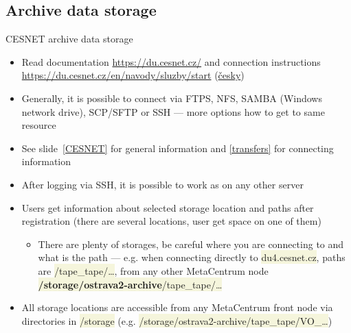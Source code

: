 \documentclass[compress, xelatex, 11pt, xcolor=svgnames, aspectratio=169,
	hyperref={
		bookmarks=true,
		unicode=true,
		colorlinks=true,
		pdftitle={Linux, command line and MetaCentrum},
		plainpages=false,
		pdfauthor={Vojtech Zeisek},
		pdfsubject={Course about use of Linux command line, writing shell scripts and using MetaCentrum of CESNET},
		pdfcreator={XeLaTeX},
		pdfkeywords={Linux, GNU, BASH, shell, command line, MetaCentrum},
		linkcolor=DarkRed, %
		anchorcolor=DarkBlue, %
		citecolor=Indigo, %
		filecolor=NavyBlue, %
		menucolor=DarkMagenta, %
		urlcolor=DarkBlue, %
		},
	url={hyphens, lowtilde} %
	]{beamer}
\renewcommand{\texttt}[1]{\colorbox{Beige}{{\ttfamily #1}}}
\begin{document}
\subsection{Archive data storage}

\begin{frame}{CESNET archive data storage}
	\begin{itemize}
		\item Read documentation \url{https://du.cesnet.cz/} and connection instructions \url{https://du.cesnet.cz/en/navody/sluzby/start} (\href{https://du.cesnet.cz/cs/navody/sluzby/start}{česky})
		\item Generally, it is possible to connect via FTPS, NFS, SAMBA (Windows network drive), SCP/SFTP or SSH --- more options how to get to same resource
		\item See slide~\ref{CESNET} for general information and \ref{transfers} for connecting information
		\item After logging via SSH, it is possible to work as on any other server
		\item Users get information about selected storage location and paths after registration (there are several locations, user get space on one of them)
		\begin{itemize}
			\item There are plenty of storages, be careful where you are connecting to and what is the path --- e.g. when connecting directly to \texttt{du4.cesnet.cz}, paths are \texttt{/tape\_tape/\ldots}, from any other MetaCentrum node \texttt{\textbf{/storage/ostrava2-archive}/tape\_tape/\ldots}
		\end{itemize}
		\item All storage locations are accessible from any MetaCentrum front node via directories in \texttt{/storage} (e.g. \texttt{/storage/ostrava2-archive/tape\_tape/VO\_\ldots})
	\end{itemize}
\end{frame}
\end{document}
